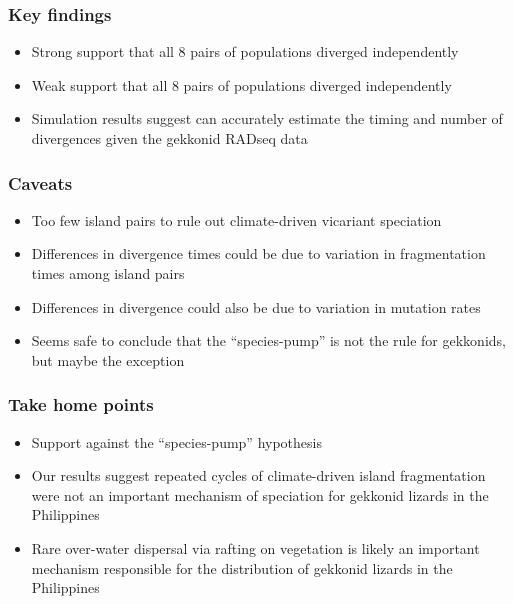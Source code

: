 \begin{frame}
    \frametitle{Key findings}
    \begin{itemize}
        \item<1-> Strong support that all 8 pairs of 
            populations diverged independently
        \item<2-> Weak support that all 8 pairs of  populations
            diverged independently
        \item<3-> Simulation results suggest \ecoevolity can accurately
            estimate the timing and number of divergences given the gekkonid
            RADseq data
    \end{itemize}
\end{frame}

\begin{frame}
    \frametitle{Caveats}
    \begin{itemize}
        \item Too few island pairs to rule out climate-driven vicariant
            speciation
        \item Differences in divergence times could be due to variation in
            fragmentation times among island pairs
        \item Differences in divergence could also be due to variation
            in mutation rates
    \end{itemize}

    \vspace{1cm}
    \begin{itemize}
        \item<2-> Seems safe to conclude that the ``species-pump'' is not the
            rule for gekkonids, but maybe the exception
    \end{itemize}
\end{frame}

\begin{frame}
    \frametitle{Take home points}
    \begin{itemize}
        \item<1-> Support against the ``species-pump'' hypothesis
        \item<2-> Our results suggest repeated cycles of climate-driven island
            fragmentation were not an important mechanism of speciation for
            gekkonid lizards in the Philippines
        \item<3-> Rare over-water dispersal via rafting on vegetation is likely
            an important mechanism responsible for the distribution of gekkonid
            lizards in the Philippines
    \end{itemize}
\end{frame}
